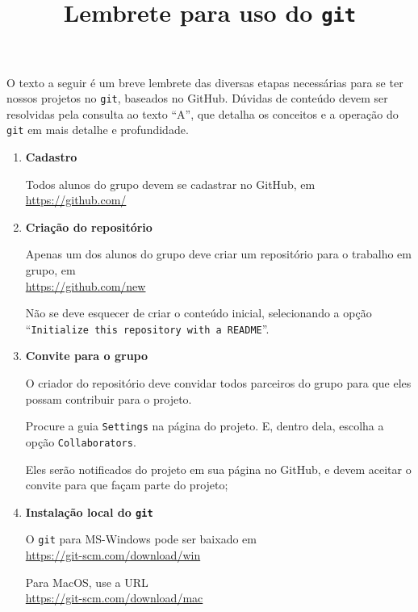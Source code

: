 \documentclass[10pt,a4paper]{article}
\title{Lembrete para uso do {\tt git}}
\begin{document}
\maketitle


\noindent
O texto a seguir é um breve lembrete das diversas etapas necessárias para se ter nossos projetos no {\tt git}, baseados no GitHub. Dúvidas de conteúdo devem ser resolvidas pela consulta ao texto ``A'', que detalha os conceitos e a operação do {\tt git} em mais detalhe e profundidade.

\begin{enumerate}
	\item {\bf Cadastro}

		Todos alunos do grupo devem se cadastrar no GitHub, em \\
		\url{https://github.com/}

	\item {\bf Criação do repositório}

		Apenas um dos alunos do grupo deve criar um repositório para o trabalho em grupo, em \\
		\url{https://github.com/new}

		Não se deve esquecer de criar o conteúdo inicial, selecionando a opção ``{\tt Initialize this repository with a README}''. 
                
	\item {\bf Convite para o grupo}

		O criador do repositório deve convidar todos parceiros do grupo para que eles possam contribuir para o projeto. 
		
		Procure a guia {\tt Settings} na página do projeto. E, dentro dela, escolha a opção  {\tt Collaborators}.

		Eles serão notificados do projeto em sua página no GitHub, e devem aceitar o convite para que façam parte do projeto;
                
	\item {\bf Instalação local do {\tt git}}
	
		O {\tt git} para MS-Windows pode ser baixado em \\
		\url{https://git-scm.com/download/win}

		Para MacOS, use a URL\\
        \url{https://git-scm.com/download/mac}


\end{enumerate}
\end{document}
